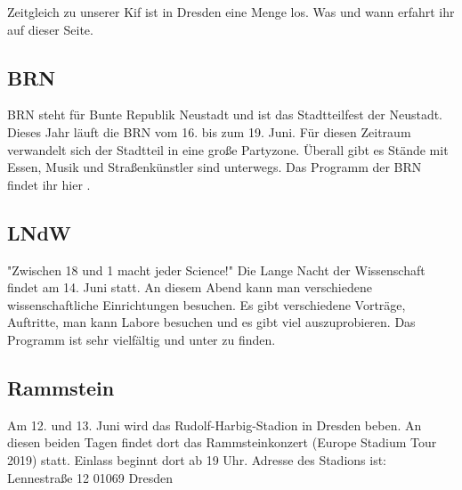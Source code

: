 Zeitgleich zu unserer Kif ist in Dresden eine Menge los. Was und wann erfahrt ihr auf dieser Seite.

\subsection*{BRN}
BRN steht für Bunte Republik Neustadt und ist das Stadtteilfest der Neustadt.
Dieses Jahr läuft die BRN vom 16. bis zum 19. Juni. Für diesen Zeitraum verwandelt sich der Stadtteil in eine große Partyzone.
Überall gibt es Stände mit Essen, Musik und Straßenkünstler sind unterwegs.
Das Programm der BRN findet ihr hier .

\subsection*{LNdW}
"Zwischen 18 und 1 macht jeder Science!"
Die Lange Nacht der Wissenschaft findet am 14. Juni statt.
An diesem Abend kann man verschiedene wissenschaftliche Einrichtungen besuchen.
Es gibt verschiedene Vorträge, Auftritte, man kann Labore besuchen und es gibt viel auszuprobieren.
Das Programm ist sehr vielfältig und unter  zu finden.

\subsection*{Rammstein}
Am 12. und 13. Juni wird das Rudolf-Harbig-Stadion in Dresden beben. An diesen beiden Tagen findet dort das Rammsteinkonzert (Europe Stadium Tour 2019) statt. Einlass beginnt dort ab 19 Uhr.
Adresse des Stadions ist:
Lennestraße 12
01069 Dresden
